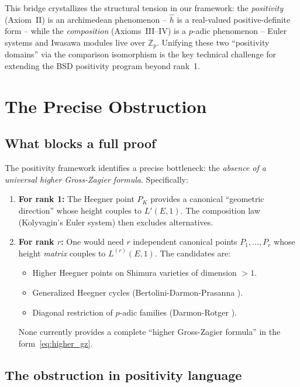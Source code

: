 \documentclass[aps,prd,twocolumn,superscriptaddress,nofootinbib]{revtex4-2}
\theoremstyle{definition}
\theoremstyle{remark}
\begin{document}
This bridge crystallizes the structural tension in our framework: the \textit{positivity} (Axiom~II) is an archimedean phenomenon -- $\hat{h}$ is a real-valued positive-definite form -- while the \textit{composition} (Axioms~III--IV) is a $p$-adic phenomenon -- Euler systems and Iwasawa modules live over $\mathbb{Z}_p$. Unifying these two ``positivity domains'' via the comparison isomorphism is the key technical challenge for extending the BSD positivity program beyond rank~1.


\section{The Precise Obstruction}
\label{sec:obstruction}

\subsection{What blocks a full proof}

The positivity framework identifies a precise bottleneck: the \textit{absence of a universal higher Gross-Zagier formula}. Specifically:

\begin{enumerate}
\item \textbf{For rank 1:} The Heegner point $P_K$ provides a canonical ``geometric direction'' whose height couples to $L'(E,1)$. The composition law (Kolyvagin's Euler system) then excludes alternatives.

\item \textbf{For rank $r$:} One would need $r$ independent canonical points $P_1, \ldots, P_r$ whose height \textit{matrix} couples to $L^{(r)}(E,1)$. The candidates are:
\begin{itemize}
\item Higher Heegner points on Shimura varieties of dimension $> 1$.
\item Generalized Heegner cycles (Bertolini-Darmon-Prasanna \cite{BDP2013}).
\item Diagonal restriction of $p$-adic families (Darmon-Rotger \cite{DarmonRotger2017}).
\end{itemize}
None currently provides a complete ``higher Gross-Zagier formula'' in the form~\eqref{eq:higher_gz}.
\end{enumerate}

\subsection{The obstruction in positivity language}
\end{document}
